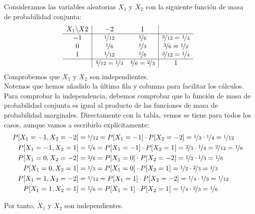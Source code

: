 \begin{ejemplo}
    Consideramos las variables aleatorias $X_1$ y $X_2$ con la siguiente función de masa de probabilidad conjunta:
    \begin{equation*}
        \begin{array}{c|cc|c}
            X_1\backslash X2 & -2 & 1 \\
            \hline
            -1 & \nicefrac{1}{12} & \nicefrac{1}{6}  & \nicefrac{3}{12}= \nicefrac{1}{4} \\
            0 & \nicefrac{1}{6} & \nicefrac{1}{3} & \nicefrac{3}{6} = \nicefrac{1}{2} \\
            1 & \nicefrac{1}{12} & \nicefrac{1}{6} & \nicefrac{3}{12} = \nicefrac{1}{4} \\ \hline
            &  \nicefrac{4}{12}= \nicefrac{1}{3} & \nicefrac{4}{6} = \nicefrac{2}{3} & 1
        \end{array}
    \end{equation*}
    Comprobemos que $X_1$ y $X_2$ son independientes.\\

    Notemos que hemos añadido la última fila y columna para facilitar los cálculos. Para comprobar la independencia, debemos comprobar que la función de masa de probabilidad conjunta es igual al producto de las funciones de masa de probabilidad marginales. Directamente con la tabla, vemos se tiene para todos los casos, aunque vamos a escribirlo explícitamente:
    \begin{align*}
        P[X_1 = -1, X_2 = -2] &= \nicefrac{1}{12} = P[X_1 = -1] \cdot P[X_2 = -2] = \nicefrac{1}{3} \cdot \nicefrac{1}{4} = \nicefrac{1}{12} \\
        P[X_1 = -1, X_2 = 1] &= \nicefrac{1}{6} = P[X_1 = -1] \cdot P[X_2 = 1] = \nicefrac{2}{3} \cdot \nicefrac{1}{4} = \nicefrac{2}{12}=\nicefrac{1}{6} \\
        P[X_1 = 0, X_2 = -2] &= \nicefrac{1}{6} = P[X_1 = 0] \cdot P[X_2 = -2] = \nicefrac{1}{2} \cdot \nicefrac{1}{3} = \nicefrac{1}{6} \\
        P[X_1 = 0, X_2 = 1] &= \nicefrac{1}{3} = P[X_1 = 0] \cdot P[X_2 = 1] = \nicefrac{1}{2} \cdot \nicefrac{2}{3} = \nicefrac{1}{3} \\
        P[X_1 = 1, X_2 = -2] &= \nicefrac{1}{12} = P[X_1 = 1] \cdot P[X_2 = -2] = \nicefrac{1}{4} \cdot \nicefrac{1}{3} = \nicefrac{1}{12} \\
        P[X_1 = 1, X_2 = 1] &= \nicefrac{1}{6} = P[X_1 = 1] \cdot P[X_2 = 1] = \nicefrac{1}{4} \cdot \nicefrac{2}{3} = \nicefrac{1}{6}
    \end{align*}

    Por tanto, $X_1$ y $X_2$ son independientes.
\end{ejemplo}


